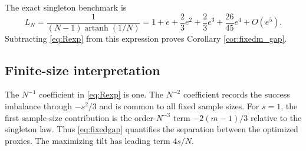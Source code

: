 The exact singleton benchmark is
\begin{equation}\label{eq:singletonL}
 L_N=\frac{1}{(N-1)\operatorname{artanh}(1/N)}
 =1+e+\frac23e^2+\frac23e^3+\frac{26}{45}e^4+O(e^5).
\end{equation}
Subtracting \eqref{eq:Rexp} from this expression proves Corollary \ref{cor:fixedm_gap}.

\subsection{Finite-size interpretation}
The $N^{-1}$ coefficient in \eqref{eq:Rexp} is one. The $N^{-2}$ coefficient records the success imbalance through $-s^2/3$ and is common to all fixed sample sizes. For $s=1$, the first sample-size contribution is the order-$N^{-3}$ term $-2(m-1)/3$ relative to the singleton law. Thus \eqref{eq:fixedgap} quantifies the separation between the optimized proxies. The maximizing tilt has leading term $4s/N$.
